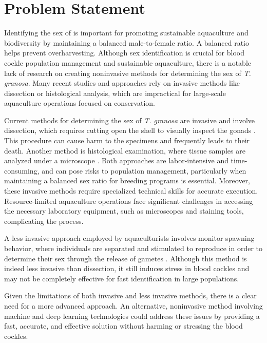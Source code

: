 \section{Problem Statement}

Identifying the sex of \Tegillarcagranosa is important for promoting sustainable aquaculture and biodiversity by maintaining a balanced male-to-female ratio. A balanced ratio helps prevent overharvesting. Although sex identification is crucial for blood cockle population management and sustainable aquaculture, there is a notable lack of research on creating noninvasive methods for determining the sex of \textit{T. granosa}. Many recent studies and approaches rely on invasive methods like dissection or histological analysis, which are impractical for large-scale aquaculture operations focused on conservation.

Current methods for determining the sex of \textit{T. granosa} are invasive and  involve dissection, which requires cutting open the shell to visually inspect the gonads \cite{erica2018}. This procedure can cause harm to the specimens and frequently leads to their death. Another method is histological examination, where tissue samples are analyzed under a microscope \cite{may2021}. Both approaches are labor-intensive and time-consuming, and can pose risks to population management, particularly when maintaining a balanced sex ratio for breeding programs is essential. Moreover, these invasive methods require specialized technical skills for accurate execution. Resource-limited aquaculture operations face significant challenges in accessing the necessary laboratory equipment, such as microscopes and staining tools, complicating the process.

A less invasive approach employed by aquaculturists involves monitor spawning behavior, where individuals are separated and stimulated to reproduce in order to determine their sex through the release of gametes \cite{miranda2023}. Although this method is indeed less invasive than dissection, it still induces stress in blood cockles and may not be completely effective for fast identification in large populations.

Given the limitations of both invasive and less invasive methods, there is a clear need for a more advanced approach. An alternative, noninvasive method involving machine and deep learning technologies could address these issues by providing a fast, accurate, and effective solution without harming or stressing the blood cockles.

